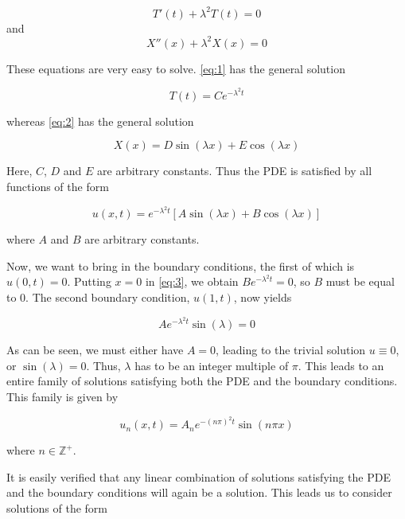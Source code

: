 \documentclass{article}
\begin{document}
\begin{equation}
    T'(t) + \lambda^2 T(t) = 0\label{eq:1}
\end{equation}
and
\begin{equation}
    X''(x) + \lambda^2 X(x) = 0\label{eq:2}
\end{equation}

These equations are very easy to solve. \eqref{eq:1} has the general solution

\begin{equation}
    T(t) = C e^{-\lambda^2 t}
\end{equation}

whereas \eqref{eq:2} has the general solution

\begin{equation}
    X(x) = D \sin(\lambda x) + E \cos(\lambda x)
\end{equation}

Here, $C$, $D$ and $E$ are arbitrary constants. Thus the PDE is satisfied by all functions of the form

\begin{equation}
    u(x, t) = e^{-\lambda^2 t}[A \sin(\lambda x) + B \cos(\lambda x)]\label{eq:3}
\end{equation}

where $A$ and $B$ are arbitrary constants.

Now, we want to bring in the boundary conditions, the first of which is $u(0, t) = 0$. Putting $x=0$ in \eqref{eq:3}, we obtain $B e^{-\lambda^2 t} = 0$, so $B$ must be equal to 0. The second boundary condition, $u(1, t)$, now yields

\begin{equation}
    A e^{-\lambda^2 t} \sin(\lambda) = 0
\end{equation}

As can be seen, we must either have $A=0$, leading to the trivial solution $u\equiv 0$, or $\sin(\lambda) = 0$. Thus, $\lambda$ has to be an integer multiple of $\pi$. This leads to an entire family of solutions satisfying both the PDE and the boundary conditions. This family is given by

\begin{equation}
    u_n(x, t) = A_n e^{-(n \pi)^2 t} \sin(n \pi x)
\end{equation}

where $n \in \mathbb{Z}^{+}$.

It is easily verified that any linear combination of solutions satisfying the PDE and the boundary conditions will again be a solution. This leads us to consider solutions of the form
\end{document}

